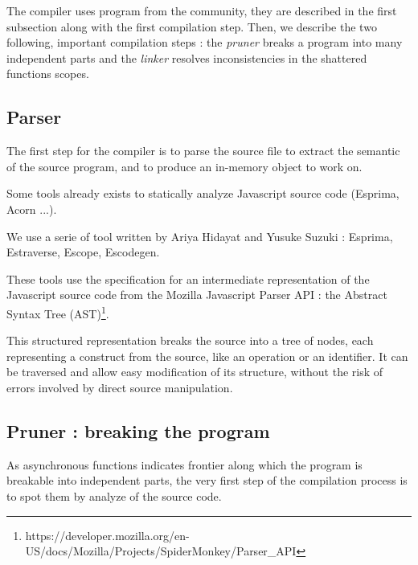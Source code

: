 

The compiler uses program from the community, they are described in the first subsection along with the first compilation step.
Then, we describe the two following, important compilation steps : the \textit{pruner} breaks a program into many independent parts and the \textit{linker} resolves inconsistencies in the shattered functions scopes.


\subsection{Parser}

The first step for the compiler is to parse the source file to extract the semantic of the source program, and to produce an in-memory object to work on.

Some tools already exists to statically analyze Javascript source code (Esprima, Acorn ...).

We use a serie of tool written by Ariya Hidayat and Yusuke Suzuki : Esprima, Estraverse, Escope, Escodegen.

These tools use the specification for an intermediate representation of the Javascript source code from the Mozilla Javascript Parser API : the Abstract Syntax Tree (AST)\footnote{\raggedright https://developer.mozilla.org/en-US/docs/Mozilla/Projects/SpiderMonkey/Parser\_API}.

This structured representation breaks the source into a tree of nodes, each representing a construct from the source, like an operation or an identifier.
It can be traversed and allow easy modification of its structure, without the risk of errors involved by direct source manipulation.



\subsection{Pruner : breaking the program}

As asynchronous functions indicates frontier along which the program is breakable into independent parts, the very first step of the compilation process is to spot them by analyze of the source code.

